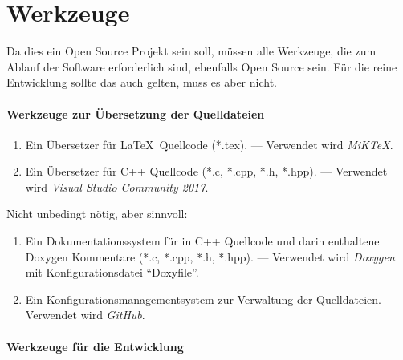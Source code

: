 \section     {Werkzeuge}%
\label   {sec:Werkzeuge}

Da dies ein Open Source Projekt sein soll, müssen alle Werkzeuge, die zum Ablauf der Software erforderlich sind, ebenfalls Open Source sein.
Für die reine Entwicklung sollte das auch gelten, muss es aber nicht.

\paragraph{Werkzeuge zur Übersetzung der Quelldateien}%

\begin{enumerate}

	\item\label{Werkzeug:LaTeX}
	Ein Übersetzer für \LaTeX\ Quellcode (*.tex).
	--- Verwendet wird \emph{MiK\TeX}.

	\item\label{Werkzeug:Cpp}
	Ein Übersetzer für C++ Quellcode (*.c, *.cpp, *.h, *.hpp).
	--- Verwendet wird \emph{Visual Studio Community 2017}.

	\setcounter{Enumi}{\value{enumi}}%
\end{enumerate}
%
Nicht unbedingt nötig, aber sinnvoll:
\begin{enumerate}
	\setcounter{enumi}{\value{Enumi}}%

	\item\label{Werkzeug:Dokumentation}
	Ein Dokumentationssystem für in C++ Quellcode und darin enthaltene Doxygen Kommentare (*.c, *.cpp, *.h, *.hpp).
	--- Verwendet wird \emph{Doxygen} mit Konfigurationsdatei "`Doxyfile"'.

	\item\label{Werkzeug:Konfigurationsmanagement}
	Ein Konfigurationsmanagementsystem zur Verwaltung der Quelldateien.
	--- Verwendet wird \emph{GitHub}.

	\setcounter{Enumi}{\value{enumi}}%
\end{enumerate}

\paragraph{Werkzeuge für die Entwicklung}%

